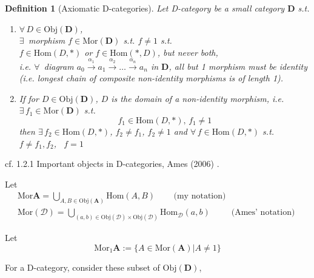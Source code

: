 \documentclass[10pt]{amsart}
\newtheorem{definition}{Definition}
\begin{document}
\begin{multicols*}{2}
\begin{definition}[Axiomatic D-categories]
Let D-category be a \emph{small} category $\mathbf{D}$ s.t.
\begin{enumerate}
	\item $\forall \, D \in \text{Obj}(\mathbf{D})$, \\
	$\exists \,$ morphism $f \in \text{Mor}(\mathbf{D})$ s.t. $f \neq 1$ s.t. \\
	$f \in \text{Hom}(D, *)$ or $f\in \text{Hom}(*, D)$, but never both, \\
	i.e. $\forall \, $ diagram $a_0 \xrightarrow{ \alpha_1} a_1 \xrightarrow{ \alpha_2} \dots \xrightarrow{ \alpha_n} a_n$ in $\mathbf{D}$, all but 1 morphism must be identity (i.e. longest chain of composite non-identity morphisms is of length 1). 
	\item If for $D\in \text{Obj}(\mathbf{D})$, $D$ is the domain of a non-identity morphism, i.e. $\exists \, f_1 \in \text{Mor}(\mathbf{D})$ s.t. 
	\[
	f_1 \in \text{Hom}(D, *), \, f_1 \neq 1
	\]
	then $\exists \, f_2 \in \text{Hom}(D, *)$, $f_2 \neq f_1$, $f_2 \neq 1$ and $\forall \, f \in \text{Hom}(D, *)$ s.t. $f\neq f_1,f_2$, \, $f=1$
\end{enumerate}
\end{definition}
	
cf. 1.2.1 Important objects in D-categories, Ames (2006) \cite{Ames2006}.

Let 
\[
\begin{gathered}
	\text{Mor}{\mathbf{A}} = \bigcup_{A, B \in \text{Obj}(\mathbf{A})} \text{Hom}(A,B) \qquad \, \text{(my notation)} \\
	\text{Mor}(\mathcal{D}) = \bigcup_{(a,b) \in \text{Obj}(\mathcal{D}) \times \text{Obj}(\mathcal{D}) } \text{Hom}_{\mathcal{D}}(a,b) \qquad \, \text{ (Ames' notation) }
\end{gathered}
\]	
	
Let 
\begin{equation}
\text{Mor}_{1}{\mathbf{A}} := \lbrace A \in \text{Mor}(\mathbf{A}) | A \neq 1 \rbrace 
\end{equation}

For a D-category, consider these subset of $\text{Obj}(\mathbf{D})$, 


\end{multicols*}
\end{document}
